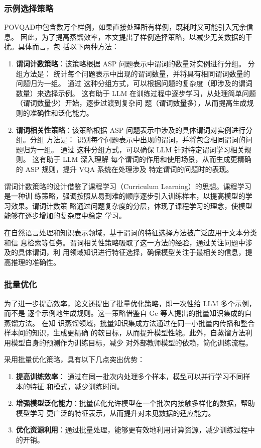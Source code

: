 \subsubsection{示例选择策略}
POVQAD中包含数万个样例，如果直接处理所有样例，既耗时又可能引入冗余信息。
因此，为了提高蒸馏效率，本文提出了样例选择策略，以减少无关数据的干扰。具体而言，包
括以下两种方法：

\begin{enumerate}[itemsep=0pt,parsep=0pt]
\item \textbf{谓词计数策略}：该策略根据 ASP 问题表示中谓词的数量对实例进行分组。 分组方法是：
统计每个问题表示中出现的谓词数量，并将具有相同谓词数量的问题归为一组。 通过
这种分组方式，可以根据问题的复杂度（即涉及的谓词数量）来选择示例。 这有助于
LLM 在训练过程中逐步学习，从处理简单问题（谓词数量少）开始，逐步过渡到复杂问
题（谓词数量多），从而提高生成规则的准确性和泛化能力。
\item \textbf{谓词相关性策略}：该策略根据 ASP 问题表示中涉及的具体谓词对实例进行分组。分组
方法是： 识别每个问题表示中出现的谓词，并将包含相同谓词的问题归为一组。 通过
这种分组方式，可以确保 LLM 针对特定谓词学习相关规则。 这有助于 LLM 深入理解
每个谓词的作用和使用场景，从而生成更精确的 ASP 规则，提升 VQA 系统在处理涉及
特定谓词的问题时的表现。
\end{enumerate}

谓词计数策略的设计借鉴了课程学习（Curriculum Learning）的思想。课程学习是一种训
练策略，强调按照从易到难的顺序逐步引入训练样本，以提高模型的学习效果。谓词计数策
略通过问题复杂度的分层，体现了课程学习的理念，使模型能够在逐步增加的复杂度中稳定
学习。

在自然语言处理和知识表示领域，基于谓词的特征选择方法被广泛应用于文本分类和信
息检索等任务。谓词相关性策略吸取了这一方法的经验，通过关注问题中涉及的具体谓词，利
用领域知识进行特征选择，确保模型关注于最相关的信息，提高推理的准确性。
\subsubsection{批量优化}
为了进一步提高效率，论文还提出了批量优化策略，即一次性给 LLM 多个示例，而不是
逐个示例地生成规则。这一策略借鉴自 Ge\cite{ge2021selfdistillationbatchknowledgeensembling} 等人提出的批量知识集成的自蒸馏方法。 在知
识蒸馏领域，批量知识集成方法通过在同一小批量内传播和整合样本间的知识，生成更精确
的软目标，从而提升模型性能。此外，自蒸馏方法利用模型自身的预测作为训练目标，减少
对外部教师模型的依赖，简化训练流程。

采用批量优化策略，具有以下几点突出优势：
\begin{enumerate}[itemsep=0pt,parsep=0pt]
\item \textbf{提高训练效率}： 通过在同一批次内处理多个样本，模型可以并行学习不同样本的特征
和模式，减少训练时间。
\item \textbf{增强模型泛化能力}：批量优化允许模型在一个批次内接触多样化的数据，帮助模型学习
更广泛的特征表示，从而提升对未见数据的适应能力。
\item \textbf{优化资源利用}：通过批量处理，能够更有效地利用计算资源，减少训练过程中的开销。
\end{enumerate}

